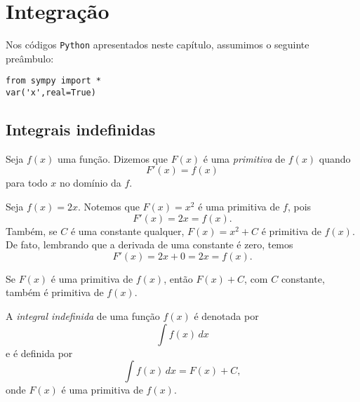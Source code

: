 
\chapter{Integração}\label{cap_int}
\thispagestyle{fancy}

\ifispython
\begin{obs}\label{obs:cap_int_python}
  Nos códigos \verb+Python+ apresentados neste capítulo, assumimos o seguinte preâmbulo:
\begin{verbatim}
from sympy import *
var('x',real=True)
\end{verbatim}
\end{obs}
\fi

\section{Integrais indefinidas}\label{cap_int_sec_intindef}

Seja $f(x)$ uma função. Dizemos que $F(x)$ é uma \emph{primitiva} de $f(x)$ quando
\begin{equation}
  F'(x) = f(x)
\end{equation}
para todo $x$ no domínio da $f$.

\begin{ex}\label{ex:primitiva}
  Seja $f(x) = 2x$. Notemos que $F(x) = x^2$ é uma primitiva de $f$, pois
  \begin{equation}
    F'(x) = 2x = f(x).
  \end{equation}
  Também, se $C$ é uma constante qualquer, $F(x) = x^2 + C$ é primitiva de $f(x)$. De fato, lembrando que a derivada de uma constante é zero, temos
  \begin{equation}
    F'(x) = 2x + 0 = 2x = f(x).
  \end{equation}
\end{ex}

\begin{obs}
  Se $F(x)$ é uma primitiva de $f(x)$, então $F(x)+C$, com $C$ constante, também é primitiva de $f(x)$.
\end{obs}

A \emph{integral indefinida} de uma função $f(x)$ é denotada por
\begin{equation}
  \int f(x)\,dx
\end{equation}
e é definida por
\begin{equation}
  \int f(x)\,dx = F(x) + C,
\end{equation}
onde $F(x)$ é uma primitiva de $f(x)$.

